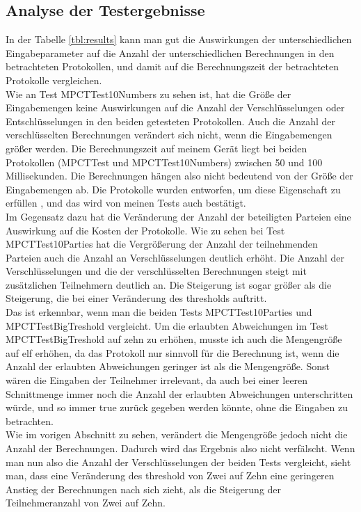 \subsection{Analyse der Testergebnisse}
In der Tabelle \ref{tbl:results} kann man gut die Auswirkungen der unterschiedlichen Eingabeparameter auf die Anzahl der unterschiedlichen Berechnungen in den betrachteten Protokollen, und damit auf die Berechnungszeit der betrachteten Protokolle vergleichen.\\
Wie an Test MPCTTest10Numbers zu sehen ist, hat die Größe der Eingabemengen keine Auswirkungen auf die Anzahl der Verschlüsselungen oder Entschlüsselungen in den beiden getesteten Protokollen. Auch die Anzahl der verschlüsselten Berechnungen verändert sich nicht, wenn die Eingabemengen größer werden. Die Berechnungszeit auf meinem Gerät liegt bei beiden Protokollen (MPCTTest und MPCTTest10Numbers) zwischen 50 und 100 Millisekunden. Die Berechnungen hängen also nicht bedeutend von der Größe der Eingabemengen ab. Die Protokolle wurden entworfen, um diese Eigenschaft zu erfüllen \cite{Doettling2021}, und das wird von meinen Tests auch bestätigt.\\
Im Gegensatz dazu hat die Veränderung der Anzahl der beteiligten Parteien eine Auswirkung auf die Kosten der Protokolle. Wie zu sehen bei Test MPCTTest10Parties hat die Vergrößerung der Anzahl der teilnehmenden Parteien auch die Anzahl an Verschlüsselungen deutlich erhöht. Die Anzahl der Verschlüsselungen und die der verschlüsselten Berechnungen steigt mit zusätzlichen Teilnehmern deutlich an. Die Steigerung ist sogar größer als die Steigerung, die bei einer Veränderung des thresholds auftritt.\\
Das ist erkennbar, wenn man die beiden Tests MPCTTest10Parties und MPCTTestBigTreshold vergleicht. Um die erlaubten Abweichungen im Test MPCTTestBigTreshold auf zehn zu erhöhen, musste ich auch die Mengengröße auf elf erhöhen, da das Protokoll nur sinnvoll für die Berechnung ist, wenn die Anzahl der erlaubten Abweichungen geringer ist als die Mengengröße. Sonst wären die Eingaben der Teilnehmer irrelevant, da auch bei einer leeren Schnittmenge immer noch die Anzahl der erlaubten Abweichungen unterschritten würde, und so immer true zurück gegeben werden könnte, ohne die Eingaben zu betrachten.\\
Wie im vorigen Abschnitt zu sehen, verändert die Mengengröße jedoch nicht die Anzahl der Berechnungen. Dadurch wird das Ergebnis also nicht verfälscht.
Wenn man nun also die Anzahl der Verschlüsselungen der beiden Tests vergleicht, sieht man, dass eine Veränderung des threshold von Zwei auf Zehn eine geringeren Anstieg der Berechnungen nach sich zieht, als die Steigerung der Teilnehmeranzahl von Zwei auf Zehn.\\
